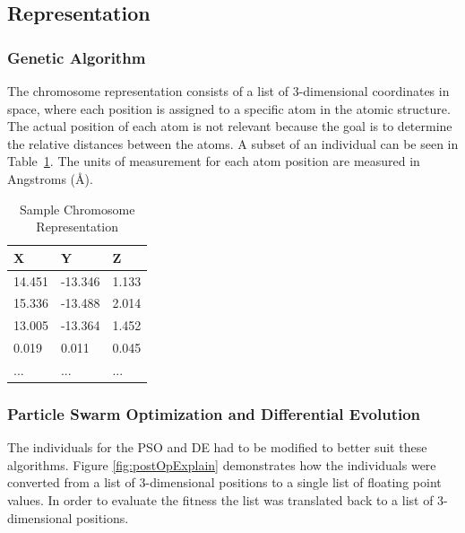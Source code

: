 \documentclass[conference]{IEEEtran}
\begin{document}
\subsection{Representation}

\subsubsection{Genetic Algorithm}

The chromosome representation consists of a list of 3-dimensional coordinates in space, where each position is assigned to a specific atom in the atomic structure. The actual position of each atom is not relevant because the goal is to determine the relative distances between the atoms. A subset of an individual can be seen in Table~\ref{table:sampleChromosome}. The units of measurement for each atom position are measured in Angstroms (\AA).

\begin{table}
\caption{Sample Chromosome Representation}
\label{table:sampleChromosome}
\centering
\normalsize
\begin{tabular}{ | l | l | l |}
  \hline
    X & Y & Z \\ \hline
    14.451 & -13.346 & 1.133 \\ \hline
    15.336 & -13.488 & 2.014 \\ \hline
    13.005 & -13.364 & 1.452 \\ \hline
    0.019 & 0.011 & 0.045 \\ \hline
    ... & ... & ... \\ \hline
\end{tabular}
\end{table}

\subsubsection{Particle Swarm Optimization and Differential Evolution}

The individuals for the PSO and DE had to be modified to better suit these algorithms. Figure \ref{fig:postOpExplain} demonstrates how the individuals were converted from a list of 3-dimensional positions to a single list of floating point values. In order to evaluate the fitness the list was translated back to a list of 3-dimensional positions.
\end{document}
